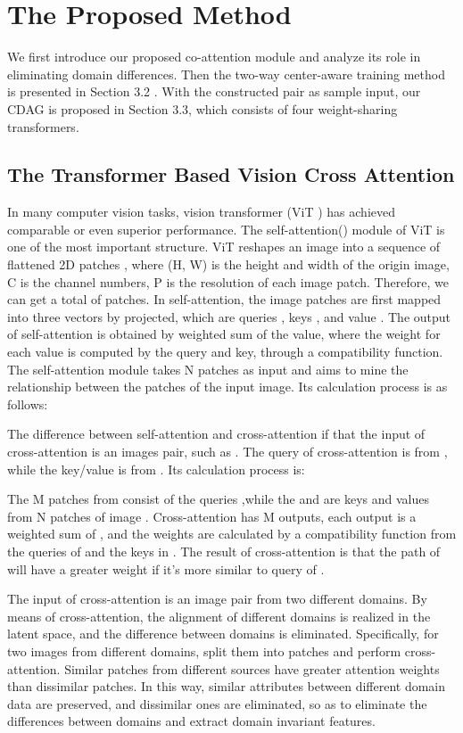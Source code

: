 \documentclass{article}
\begin{document}
\section{The Proposed Method}
We first introduce our proposed co-attention module and analyze its role in eliminating domain differences. Then the two-way center-aware training method is presented in Section 3.2 . With the constructed pair as sample input, our CDAG  is proposed in Section 3.3,  which consists of four weight-sharing transformers.
\subsection{The Transformer Based Vision Cross Attention}
In many computer vision tasks, vision transformer (ViT \cite{dosovitskiy2020image} )  has achieved comparable or even superior performance. The self-attention(\cite{vaswani2017attention}) module of ViT is one of the most important structure. ViT reshapes an image  into a sequence of flattened 2D patches , where (H, W) is the height and width of the origin image, C is the channel numbers, P is the resolution of each image patch. Therefore, we can get a total of   patches. In self-attention, the image patches are first mapped into three vectors by projected, which are queries , keys , and value . The output of self-attention is obtained by weighted sum of the value, where the weight for each value is computed by the query and key, through a compatibility function. The self-attention module takes N patches as input and aims to mine the relationship between the patches of the input image. Its  calculation process is as follows:


The difference between self-attention and cross-attention if that the input of cross-attention is an images pair, such as . The query  of cross-attention is from , while the key/value is from . Its  calculation process is:


The M patches from  consist of the queries  ,while the  and  are keys and values from N patches of image . Cross-attention has M outputs, each output is a weighted sum of , and the weights are calculated by a compatibility function from the queries of  and the keys in . The result of cross-attention is that the path of  will have a greater weight if it's more similar to query of .

The input of cross-attention is an image pair from two different domains. By means of cross-attention, the alignment of different domains is realized in the latent space, and the difference between domains is eliminated. Specifically, for two images from different domains, split them into patches and perform cross-attention. Similar patches from different sources have greater attention weights than dissimilar patches. In this way, similar attributes between different domain data are preserved, and dissimilar ones are eliminated, so as to eliminate the differences between domains and extract domain invariant features.
\end{document}

